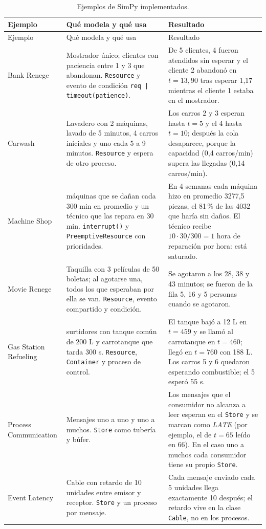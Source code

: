 \documentclass[11pt,letterpaper]{article}
\begin{document}
\begin{longtable}{@{}>{\raggedright\arraybackslash}p{2.6cm}>{\raggedright\arraybackslash}p{5.6cm}>{\raggedright\arraybackslash}p{7.2cm}@{}}
\caption{Ejemplos de SimPy implementados.}\label{tab:simpy}\\
\toprule
Ejemplo & Qué modela y qué usa & Resultado \\
\midrule
\endfirsthead
\toprule
Ejemplo & Qué modela y qué usa & Resultado \\
\midrule
\endhead
Bank Renege & Mostrador único; clientes con paciencia entre 1 y 3 que abandonan. \texttt{Resource} y evento de
condición \texttt{req | timeout(patience)}. & De 5 clientes, 4 fueron atendidos sin esperar y el cliente 2
abandonó en $t = 13{,}90$ tras esperar 1,17 mientras el cliente 1 estaba en el mostrador. \\
\addlinespace
Carwash & Lavadero con 2 máquinas, lavado de 5 minutos, 4 carros iniciales y uno cada 5 a 9 minutos.
\texttt{Resource} y espera de otro proceso. & Los carros 2 y 3 esperan hasta $t = 5$ y el 4 hasta $t = 10$;
después la cola desaparece, porque la capacidad (0,4 carros/min) supera las llegadas (0,14 carros/min). \\
\addlinespace
Machine Shop & 10 máquinas que se dañan cada 300 min en promedio y un técnico que las repara en 30 min.
\texttt{interrupt()} y \texttt{PreemptiveResource} con prioridades. & En 4 semanas cada máquina hizo en promedio
3277,5 piezas, el 81\,\% de las 4032 que haría sin daños. El técnico recibe $10 \cdot 30/300 = 1$ hora de
reparación por hora: está saturado. \\
\addlinespace
Movie Renege & Taquilla con 3 películas de 50 boletas; al agotarse una, todos los que esperaban por ella se van.
\texttt{Resource}, evento compartido y condición. & Se agotaron a los 28, 38 y 43 minutos; se fueron de la fila
5, 16 y 5 personas cuando se agotaron. \\
\addlinespace
Gas Station Refueling & 2 surtidores con tanque común de 200 L y carrotanque que tarda 300 s.
\texttt{Resource}, \texttt{Container} y proceso de control. & El tanque bajó a 12 L en $t = 459$ y se llamó al
carrotanque en $t = 460$; llegó en $t = 760$ con 188 L. Los carros 5 y 6 quedaron esperando combustible; el 5
esperó 55 s. \\
\addlinespace
Process Communication & Mensajes uno a uno y uno a muchos. \texttt{Store} como tubería y búfer. & Los mensajes
que el consumidor no alcanza a leer esperan en el \texttt{Store} y se marcan como \emph{LATE} (por ejemplo, el de
$t = 65$ leído en 66). En el caso uno a muchos cada consumidor tiene su propio \texttt{Store}. \\
\addlinespace
Event Latency & Cable con retardo de 10 unidades entre emisor y receptor. \texttt{Store} y un proceso por
mensaje. & Cada mensaje enviado cada 5 unidades llega exactamente 10 después; el retardo vive en la clase
\texttt{Cable}, no en los procesos. \\
\bottomrule
\end{longtable}
\end{document}

